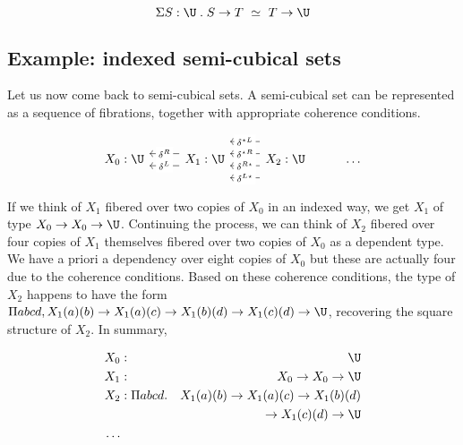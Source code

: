 \documentclass[10pt]{art.cls/art}
\newcommand{\kstar}{{\star}}
\begin{document}
\begin{equation*}
  \Sigma S: \U\;.\;S\rightarrow T ~\simeq~ T \rightarrow \U
\end{equation*}

\subsection{Example: indexed semi-cubical sets}

Let us now come back to semi-cubical sets. A semi-cubical set can be represented as a sequence of fibrations, together with appropriate coherence conditions.

\begin{equation*}
  \begin{tikzcd}
    X_0 : \U & X_1 : \U \arrow[l, "\delta^L" description, shift left=2] \arrow[l, "\delta^R" description, shift right=2] & X_2 : \U \arrow[l, "\delta^{L\kstar}" description, shift left=6] \arrow[l, "\delta^{R\kstar}" description, shift left=2] \arrow[l, "\delta^{\kstar R}" description, shift right=2] \arrow[l, "\delta^{\kstar L}" description, shift right=6] & \ldots
  \end{tikzcd}
\end{equation*}

If we think of $X_1$ fibered over two copies of $X_0$ in an indexed way, we get $X_1$ of type $X_0 \rightarrow X_0 \rightarrow \U$. Continuing the process, we can think of $X_2$ fibered over four copies of $X_1$ themselves fibered over two copies of $X_0$ as a dependent type. We have a priori a dependency over eight copies of $X_0$ but these are actually four due to the coherence conditions. Based on these coherence conditions, the type of $X_2$ happens to have the form $\Pi a b c d, X_1 (a)(b) \rightarrow X_1 (a)(c) \rightarrow X_1 (b)(d) \rightarrow X_1 (c)(d) \rightarrow \U$, recovering the square structure of $X_2$. In summary,

\begin{align*}
  X_0 & :              & \U                                                     \\
  X_1 & :              & X_0 \rightarrow X_0 \rightarrow \U                     \\
  X_2 & : \Pi a b c d. & X_1(a)(b) \rightarrow X_1(a)(c) \rightarrow X_1 (b)(d) \\
      &                & \rightarrow X_1 (c)(d) \rightarrow \U                  \\
  \ldots
\end{align*}
\end{document}
